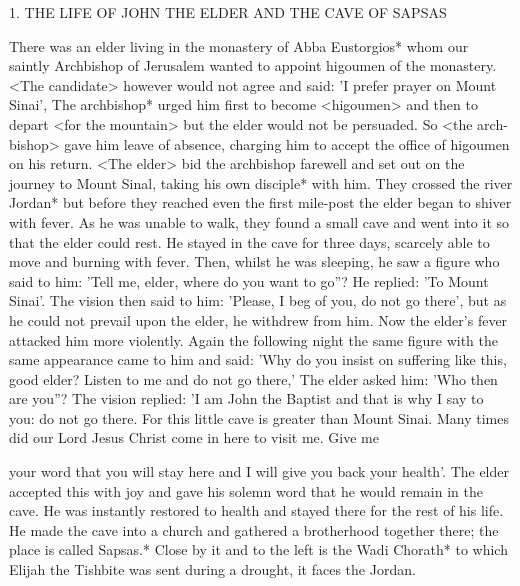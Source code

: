 1. THE LIFE OF JOHN THE ELDER
AND THE CAVE OF SAPSAS

There was an elder living in the monastery of Abba Eustorgios*
whom our saintly Archbishop of Jerusalem wanted to appoint
higoumen of the monastery. <The candidate> however would not
agree and said: 'I prefer prayer on Mount Sinai', The archbishop*
urged him first to become <higoumen> and then to depart <for the
mountain> but the elder would not be persuaded. So <the arch-
bishop> gave him leave of absence, charging him to accept the
office of higoumen on his return. <The elder> bid the archbishop
farewell and set out on the journey to Mount Sinal, taking his own
disciple* with him. They crossed the river Jordan* but before they
reached even the first mile-post the elder began to shiver with fever.
As he was unable to walk, they found a small cave and went into
it so that the elder could rest. He stayed in the cave for three days,
scarcely able to move and burning with fever. Then, whilst he was
sleeping, he saw a figure who said to him: 'Tell me, elder, where do
you want to go”? He replied: 'To Mount Sinai'. The vision then said
to him: 'Please, I beg of you, do not go there', but as he could not
prevail upon the elder, he withdrew from him. Now the elder's fever
attacked him more violently. Again the following night the same
figure with the same appearance came to him and said: 'Why do
you insist on suffering like this, good elder? Listen to me and do not
go there,' The elder asked him: 'Who then are you”? The vision
replied: 'I am John the Baptist and that is why I say to you: do not
go there. For this little cave is greater than Mount Sinai. Many
times did our Lord Jesus Christ come in here to visit me. Give me

your word that you will stay here and I will give you back your
health'. The elder accepted this with joy and gave his solemn word
that he would remain in the cave. He was instantly restored to
health and stayed there for the rest of his life. He made the cave
into a church and gathered a brotherhood together there; the place
is called Sapsas.* Close by it and to the left is the Wadi Chorath*
to which Elijah the Tishbite was sent during a drought, it faces the
Jordan.

